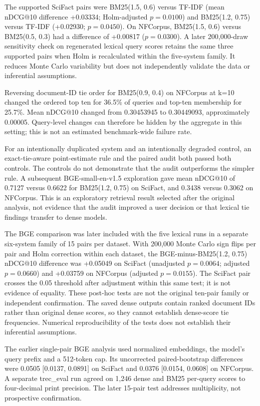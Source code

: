 \documentclass[runningheads]{llncs}
\begin{document}
The supported SciFact pairs were BM25(1.5, 0.6) versus TF-IDF (mean
nDCG@10 difference +0.03334; Holm-adjusted \(p = 0.0100\)) and BM25(1.2,
0.75) versus TF-IDF (+0.02930; \(p = 0.0450\)). On NFCorpus, BM25(1.5,
0.6) versus BM25(0.5, 0.3) had a difference of +0.00817
(\(p = 0.0300\)). A later 200,000-draw sensitivity check on regenerated
lexical query scores retains the same three supported pairs when Holm is
recalculated within the five-system family. It reduces Monte Carlo
variability but does not independently validate the data or inferential
assumptions.

Reversing document-ID tie order for BM25(0.9, 0.4) on NFCorpus at k=10
changed the ordered top ten for 36.5\% of queries and top-ten membership
for 25.7\%. Mean nDCG@10 changed from 0.30453945 to 0.30449093,
approximately 0.00005. Query-level changes can therefore be hidden by
the aggregate in this setting; this is not an estimated benchmark-wide
failure rate.

For an intentionally duplicated system and an intentionally degraded
control, an exact-tie-aware point-estimate rule and the paired audit
both passed both controls. The controls do not demonstrate that the
audit outperforms the simpler rule. A subsequent BGE-small-en-v1.5
\cite{r11} exploration gave mean nDCG@10 of 0.7127 versus 0.6622 for
BM25(1.2, 0.75) on SciFact, and 0.3438 versus 0.3062 on NFCorpus. This
is an exploratory retrieval result selected after the original analysis,
not evidence that the audit improved a user decision or that lexical tie
findings transfer to dense models.

The BGE comparison was later included with the five lexical runs in a
separate six-system family of 15 pairs per dataset. With 200,000 Monte
Carlo sign flips per pair and Holm correction within each dataset, the
BGE-minus-BM25(1.2, 0.75) nDCG@10 difference was +0.05049 on SciFact
(unadjusted \(p = 0.0064\); adjusted \(p = 0.0660\)) and +0.03759 on
NFCorpus (adjusted \(p = 0.0155\)). The SciFact pair crosses the 0.05
threshold after adjustment within this same test; it is not evidence of
equality. These post-hoc tests are not the original ten-pair family or
independent confirmation. The saved dense outputs contain ranked
document IDs rather than original dense scores, so they cannot establish
dense-score tie frequencies. Numerical reproducibility of the tests does
not establish their inferential assumptions.

The earlier single-pair BGE analysis used normalized embeddings, the
model's query prefix and a 512-token cap. Its uncorrected
paired-bootstrap differences were 0.0505 {[}0.0137, 0.0891{]} on SciFact
and 0.0376 {[}0.0154, 0.0608{]} on NFCorpus. A separate trec\_eval run
agreed on 1,246 dense and BM25 per-query scores to four-decimal print
precision. The later 15-pair test addresses multiplicity, not
prospective confirmation.
\end{document}
